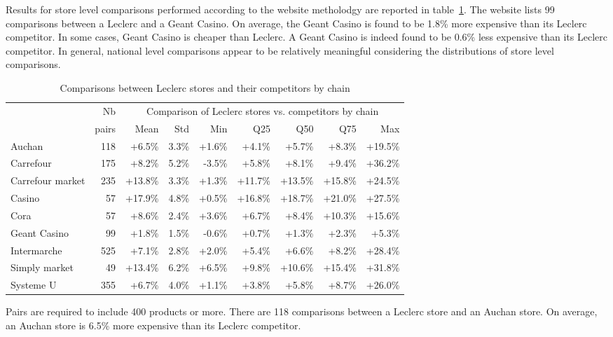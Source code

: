\documentclass[english]{article}
\begin{document}
Results for store level comparisons performed according to the website metholodgy are reported in table~\ref{tab:qlmc_store_comparisons}. The website lists 99 comparisons between a Leclerc and a Geant Casino. On average, the Geant Casino is found to be 1.8\% more expensive than its Leclerc competitor.  In some cases, Geant Casino is cheaper than Leclerc. A Geant Casino is indeed found to be 0.6\% less expensive than its Leclerc competitor. In general, national level comparisons appear to be relatively meaningful considering the distributions of store level comparisons.

\begin{table}[H]
\caption{Comparisons between Leclerc stores and their competitors by chain}
\label{tab:qlmc_store_comparisons}
\begin{threeparttable}
\renewcommand{\arraystretch}{0.7}%
\small
\begin{tabular}{lr|rrrrrrr}
\toprule
\toprule
          & Nb    & \multicolumn{7}{c}{Comparison of Leclerc stores vs. competitors by chain} \\
          & pairs & Mean  & Std   & Min   & Q25  & Q50 & Q75  & Max \\
\midrule
    Auchan & 118   & +6.5\% & 3.3\% & +1.6\% & +4.1\% & +5.7\% & +8.3\% & +19.5\% \\
    Carrefour & 175   & +8.2\% & 5.2\% & -3.5\% & +5.8\% & +8.1\% & +9.4\% & +36.2\% \\
    Carrefour market & 235   & +13.8\% & 3.3\% & +1.3\% & +11.7\% & +13.5\% & +15.8\% & +24.5\% \\
    Casino & 57    & +17.9\% & 4.8\% & +0.5\% & +16.8\% & +18.7\% & +21.0\% & +27.5\% \\
    Cora  & 57    & +8.6\% & 2.4\% & +3.6\% & +6.7\% & +8.4\% & +10.3\% & +15.6\% \\
    Geant Casino & 99    & +1.8\% & 1.5\% & -0.6\% & +0.7\% & +1.3\% & +2.3\% & +5.3\% \\
    Intermarche & 525   & +7.1\% & 2.8\% & +2.0\% & +5.4\% & +6.6\% & +8.2\% & +28.4\% \\
    Simply market & 49    & +13.4\% & 6.2\% & +6.5\% & +9.8\% & +10.6\% & +15.4\% & +31.8\% \\
    Systeme U & 355   & +6.7\% & 4.0\% & +1.1\% & +3.8\% & +5.8\% & +8.7\% & +26.0\% \\
\bottomrule
\bottomrule
\end{tabular}
\begin{tablenotes}
      \small
      \item Pairs are required to include 400 products or more. There are 118 comparisons between a Leclerc store and an Auchan store. On average, an Auchan store is 6.5\% more expensive than its Leclerc competitor.
\end{tablenotes}
\end{threeparttable}
\end{table}
\end{document}
